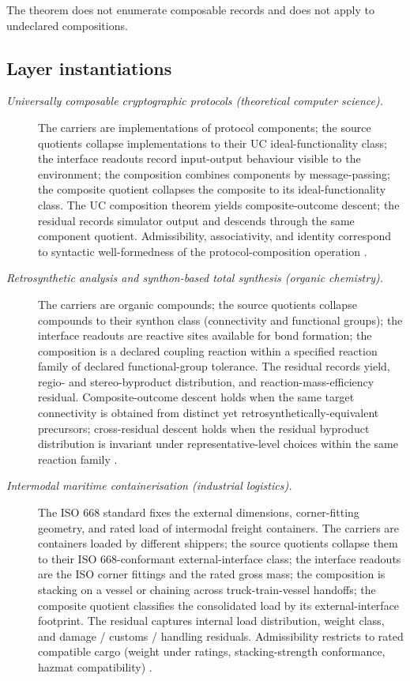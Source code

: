 \documentclass[11pt]{article}
\theoremstyle{definition}
\begin{document}
The theorem does not enumerate composable records and does not apply
to undeclared compositions.

\subsection*{Layer instantiations}\label{layer-inst:F28}

\begin{description}
\item[\emph{Universally composable cryptographic
protocols (theoretical computer science).}]
The carriers are implementations of protocol components;
the source quotients collapse implementations to their
UC ideal-functionality class; the interface readouts
record input-output behaviour visible to the
environment; the composition combines components by
message-passing; the composite quotient collapses the
composite to its ideal-functionality class.  The UC
composition theorem yields composite-outcome descent;
the residual records simulator output and descends
through the same component quotient.  Admissibility,
associativity, and identity correspond to syntactic
well-formedness of the protocol-composition operation
\citep{Canetti2001UC}.

\item[\emph{Retrosynthetic analysis and synthon-based
total synthesis (organic chemistry).}]
The carriers are organic compounds; the source quotients
collapse compounds to their synthon class (connectivity
and functional groups); the interface readouts are
reactive sites available for bond formation; the
composition is a declared coupling reaction within a
specified reaction family of declared functional-group
tolerance.  The residual records yield, regio- and
stereo-byproduct distribution, and
reaction-mass-efficiency residual.  Composite-outcome
descent holds
when the same target connectivity is obtained from
distinct yet retrosynthetically-equivalent precursors;
cross-residual descent holds when the residual
byproduct distribution is invariant under
representative-level choices within the same reaction
family \citep{Corey1989LogicSynthesis}.

\item[\emph{Intermodal maritime containerisation
(industrial logistics).}]
The ISO 668 standard fixes the external dimensions,
corner-fitting geometry, and rated load of intermodal
freight containers.  The carriers are containers loaded
by different shippers; the source quotients collapse
them to their ISO 668-conformant external-interface
class; the interface readouts are the ISO corner
fittings and the rated gross mass; the composition is
stacking on a vessel or chaining across
truck-train-vessel handoffs; the composite quotient
classifies the consolidated load by its
external-interface footprint.  The residual captures
internal load distribution, weight class, and
damage / customs / handling residuals.  Admissibility
restricts to rated compatible cargo (weight under
ratings, stacking-strength conformance, hazmat
compatibility) \citep{ISO668_2020}.


\end{description}
\end{document}
